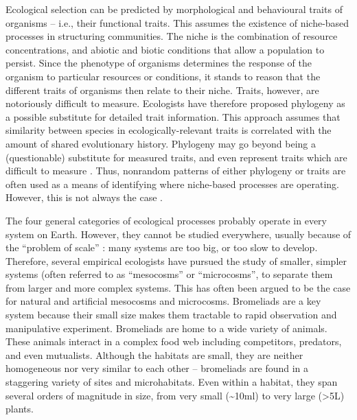 Ecological selection can be predicted by morphological and behavioural
traits of organisms -- i.e., their functional traits. This assumes the
existence of niche-based processes in structuring communities. The niche
is the combination of resource concentrations, and abiotic and biotic
conditions that allow a population to persist. Since the phenotype of
organisms determines the response of the organism to particular
resources or conditions, it stands to reason that the different traits
of organisms then relate to their niche. Traits, however, are
notoriously difficult to measure. Ecologists have therefore proposed
phylogeny as a possible substitute for detailed trait information. This
approach assumes that similarity between species in
ecologically-relevant traits is correlated with the amount of shared
evolutionary history. Phylogeny may go beyond being a (questionable)
substitute for measured traits, and even represent traits which are
difficult to measure \citep{Cadotte2008, Srivastava2012c}. Thus,
nonrandom patterns of either phylogeny or traits are often used as a
means of identifying where niche-based processes are operating. However,
this is not always the case \citep{Mayfield2010}.

The four general categories of ecological processes probably operate in
every system on Earth. However, they cannot be studied everywhere,
usually because of the ``problem of scale'' \citep{Levin1992}: many
systems are too big, or too slow to develop. Therefore, several
empirical ecologists have pursued the study of smaller, simpler systems
(often referred to as ``mesocosms'' or ``microcosms'', to separate them
from larger and more complex systems. This has often been argued to be
the case for natural \citep{Srivastava2004a} and artificial
\citep{W.Fox2007} mesocosms and microcosms. Bromeliads are a key system
because their small size makes them tractable to rapid observation and
manipulative experiment. Bromeliads are home to a wide variety of
animals. These animals interact in a complex food web including
competitors, predators, and even mutualists. Although the habitats are
small, they are neither homogeneous nor very similar to each other --
bromeliads are found in a staggering variety of sites and microhabitats.
Even within a habitat, they span several orders of magnitude in size,
from very small (\textasciitilde{}10ml) to very large (\textgreater{}5L)
plants.

